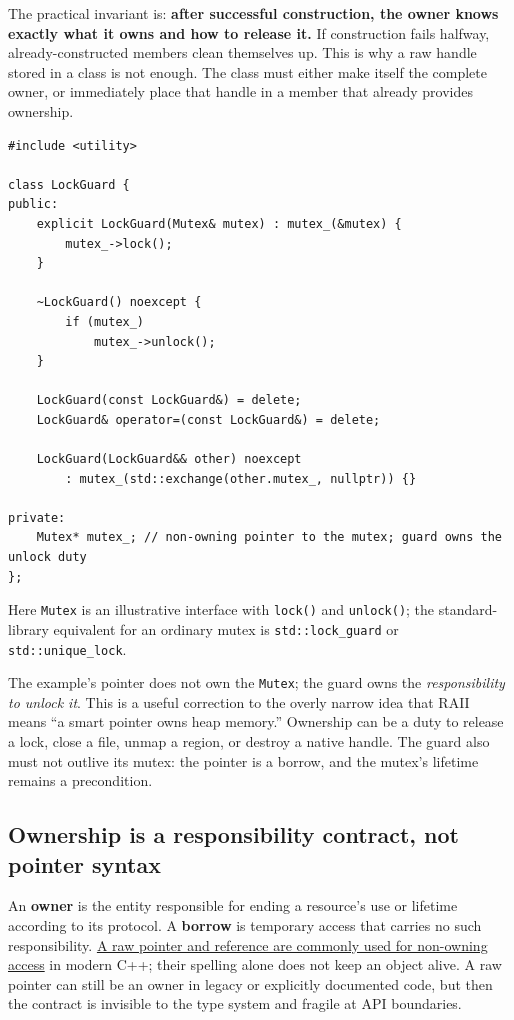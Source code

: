 The practical invariant is: \textbf{after successful construction, the owner knows exactly what it owns and how to release it.} If construction fails halfway, already-constructed members clean themselves up. This is why a raw handle stored in a class is not enough. The class must either make itself the complete owner, or immediately place that handle in a member that already provides ownership.

\begin{verbatim}
#include <utility>

class LockGuard {
public:
    explicit LockGuard(Mutex& mutex) : mutex_(&mutex) {
        mutex_->lock();
    }

    ~LockGuard() noexcept {
        if (mutex_)
            mutex_->unlock();
    }

    LockGuard(const LockGuard&) = delete;
    LockGuard& operator=(const LockGuard&) = delete;

    LockGuard(LockGuard&& other) noexcept
        : mutex_(std::exchange(other.mutex_, nullptr)) {}

private:
    Mutex* mutex_; // non-owning pointer to the mutex; guard owns the unlock duty
};
\end{verbatim}

Here \texttt{Mutex} is an illustrative interface with \texttt{lock()} and \texttt{unlock()}; the standard-library equivalent for an ordinary mutex is \texttt{std::lock\_guard} or \texttt{std::unique\_lock}.

The example's pointer does not own the \texttt{Mutex}; the guard owns the \emph{responsibility to unlock it}. This is a useful correction to the overly narrow idea that RAII means ``a smart pointer owns heap memory.'' Ownership can be a duty to release a lock, close a file, unmap a region, or destroy a native handle. The guard also must not outlive its mutex: the pointer is a borrow, and the mutex's lifetime remains a precondition.

\subsection{Ownership is a responsibility contract, not pointer syntax}\label{05-engine-i-ch004-ownership-is-a-responsibility-contract-not-pointer-syntax}

An \textbf{owner} is the entity responsible for ending a resource's use or lifetime according to its protocol. A \textbf{borrow} is temporary access that carries no such responsibility. \hyperref[appendix-d52e4486f527]{A raw pointer and reference are commonly used for non-owning access} in modern C++; their spelling alone does not keep an object alive. A raw pointer can still be an owner in legacy or explicitly documented code, but then the contract is invisible to the type system and fragile at API boundaries.

